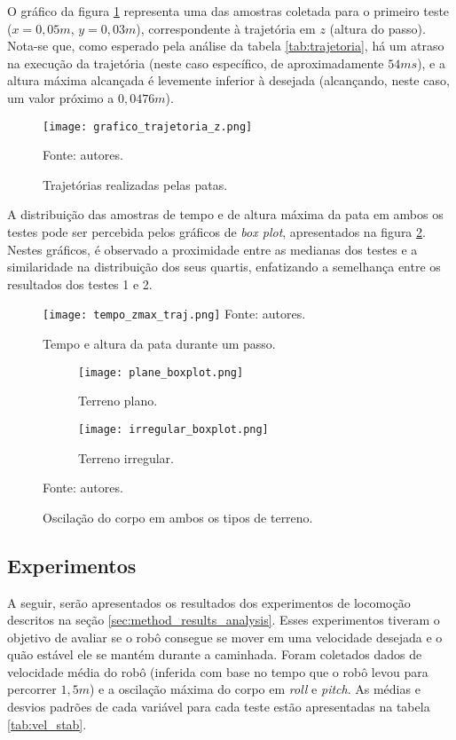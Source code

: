 \documentclass[conference]{IEEEtran}
\begin{document}
  O gráfico da figura \ref{fig:grafico_trajetoria_xyz} representa uma das amostras coletada para o primeiro teste ($x=0,05m$, $y=0,03m$), correspondente à trajetória em $z$ (altura do passo). Nota-se que, como esperado pela análise da tabela \ref{tab:trajetoria}, há um atraso na execução da trajetória (neste caso específico, de aproximadamente $54ms$), e a altura máxima alcançada é levemente inferior à desejada (alcançando, neste caso, um valor próximo a $0,0476m$).
  
  \begin{figure}[!htb]
    \centering
    \texttt{[image: grafico\_trajetoria\_z.png]}
    \caption{Trajetórias realizadas pelas patas.}
    Fonte: autores.
    \label{fig:grafico_trajetoria_xyz}
  \end{figure}

  A distribuição das amostras de tempo e de altura máxima da pata em ambos os testes pode ser percebida pelos gráficos de \textit{box plot}, apresentados na figura \ref{fig:time_zmax_traj}. Nestes gráficos, é observado a proximidade entre as medianas dos testes e a similaridade na distribuição dos seus quartis, enfatizando a semelhança entre os resultados dos testes 1 e 2.

  \begin{figure}[!htb]
    \centering
    \caption{Tempo e altura da pata durante um passo.}
    \texttt{[image: tempo\_zmax\_traj.png]}
    Fonte: autores.
    \label{fig:time_zmax_traj}
  \end{figure}

  \begin{figure}[!htb]
    \centering
    \begin{subfigure}[t]{0.49\textwidth}
      \centering
      \texttt{[image: plane\_boxplot.png]}
      \caption{Terreno plano.}
      \label{fig:imu_test_plane}
    \end{subfigure}
    \begin{subfigure}[t]{0.49\textwidth}
      \centering
      \texttt{[image: irregular\_boxplot.png]}
      \caption{Terreno irregular.}
      \label{fig:imu_test_irregular}
    \end{subfigure}
    \caption{Oscilação do corpo em ambos os tipos de terreno.}
    Fonte: autores.
    \label{fig:imu_test}
  \end{figure}

  \subsection{Experimentos}
  A seguir, serão apresentados os resultados dos experimentos de locomoção descritos na seção \ref{sec:method_results_analysis}. Esses experimentos tiveram o objetivo de avaliar se o robô consegue se mover em uma velocidade desejada e o quão estável ele se mantém durante a caminhada. Foram coletados dados de velocidade média do robô (inferida com base no tempo que o robô levou para percorrer $1,5m$) e a oscilação máxima do corpo em \textit{roll} e \textit{pitch}. As médias e desvios padrões de cada variável para cada teste estão apresentadas na tabela \ref{tab:vel_stab}. 
  
\end{document}
